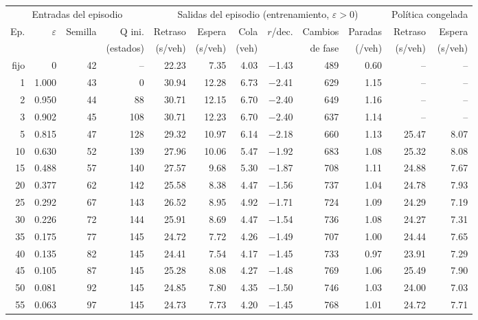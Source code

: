 \begin{table}[H]
\centering
\scriptsize
\setlength{\tabcolsep}{3pt}
\begin{tabular}{rrrrrrrrrrrr}
\toprule
\multicolumn{4}{c}{Entradas del episodio} & \multicolumn{6}{c}{Salidas del episodio (entrenamiento, $\varepsilon>0$)} & \multicolumn{2}{c}{Política congelada} \\
\cmidrule(lr){1-4}\cmidrule(lr){5-10}\cmidrule(lr){11-12}
Ep. & $\varepsilon$ & Semilla & Q ini. & Retraso & Espera & Cola & $r$/dec. & Cambios & Paradas & Retraso & Espera \\
 &  &  & (estados) & (s/veh) & (s/veh) & (veh) &  & de fase & (/veh) & (s/veh) & (s/veh) \\
\midrule
fijo & 0 & 42 & -- & 22.23 & 7.35 & 4.03 & $-$1.43 & 489 & 0.60 & -- & -- \\
\midrule
1 & 1.000 & 43 & 0 & 30.94 & 12.28 & 6.73 & $-$2.41 & 629 & 1.15 & -- & -- \\
2 & 0.950 & 44 & 88 & 30.71 & 12.15 & 6.70 & $-$2.40 & 649 & 1.16 & -- & -- \\
3 & 0.902 & 45 & 108 & 30.71 & 12.23 & 6.70 & $-$2.40 & 637 & 1.14 & -- & -- \\
5 & 0.815 & 47 & 128 & 29.32 & 10.97 & 6.14 & $-$2.18 & 660 & 1.13 & 25.47 & 8.07 \\
10 & 0.630 & 52 & 139 & 27.96 & 10.06 & 5.47 & $-$1.92 & 683 & 1.08 & 25.32 & 8.08 \\
15 & 0.488 & 57 & 140 & 27.57 & 9.68 & 5.30 & $-$1.87 & 708 & 1.11 & 24.88 & 7.67 \\
20 & 0.377 & 62 & 142 & 25.58 & 8.38 & 4.47 & $-$1.56 & 737 & 1.04 & 24.78 & 7.93 \\
25 & 0.292 & 67 & 143 & 26.52 & 8.95 & 4.92 & $-$1.71 & 724 & 1.09 & 24.29 & 7.19 \\
30 & 0.226 & 72 & 144 & 25.91 & 8.69 & 4.47 & $-$1.54 & 736 & 1.08 & 24.27 & 7.31 \\
35 & 0.175 & 77 & 145 & 24.72 & 7.72 & 4.26 & $-$1.49 & 707 & 1.00 & 24.44 & 7.65 \\
40 & 0.135 & 82 & 145 & 24.41 & 7.54 & 4.17 & $-$1.45 & 733 & 0.97 & 23.91 & 7.29 \\
45 & 0.105 & 87 & 145 & 25.28 & 8.08 & 4.27 & $-$1.48 & 769 & 1.06 & 25.49 & 7.90 \\
50 & 0.081 & 92 & 145 & 24.85 & 7.80 & 4.35 & $-$1.50 & 746 & 1.03 & 24.00 & 7.03 \\
55 & 0.063 & 97 & 145 & 24.73 & 7.73 & 4.20 & $-$1.45 & 768 & 1.01 & 24.72 & 7.71 \\

\end{tabular}
\end{table}
